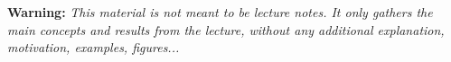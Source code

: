\textbf{Warning:}
\emph{This material is not meant to be lecture notes. It only gathers the main concepts and results from the lecture, without any additional explanation, motivation, examples, figures...
}

